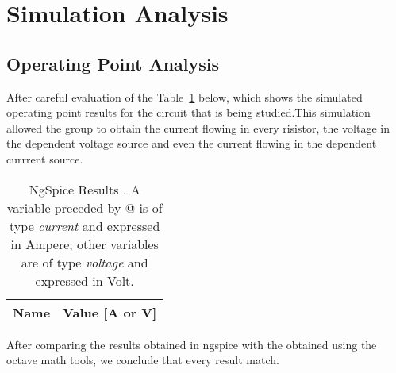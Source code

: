 \section{Simulation Analysis}
\label{sec:simulation}

\subsection{Operating Point Analysis}

After careful evaluation of the Table~\ref{tab:op} below, which shows the simulated operating point results for the circuit that is being studied.This simulation allowed the group to obtain the current flowing in every risistor, the voltage in the dependent voltage source and even the current flowing in the dependent currrent source. 
\begin{table}[h]
  \centering
  \begin{tabular}{|l|r|}
    \hline    
    {\bf Name} & {\bf Value [A or V]} \\ \hline
    
  \end{tabular}
  \caption{NgSpice Results . A variable preceded by @ is of type {\em current}
    and expressed in Ampere; other variables are of type {\it voltage} and expressed in
    Volt.}
  \label{tab:op}
\end{table}

After comparing the results obtained in ngspice with the obtained using the octave math tools, we conclude that every result match.

\lipsum[1-1]




